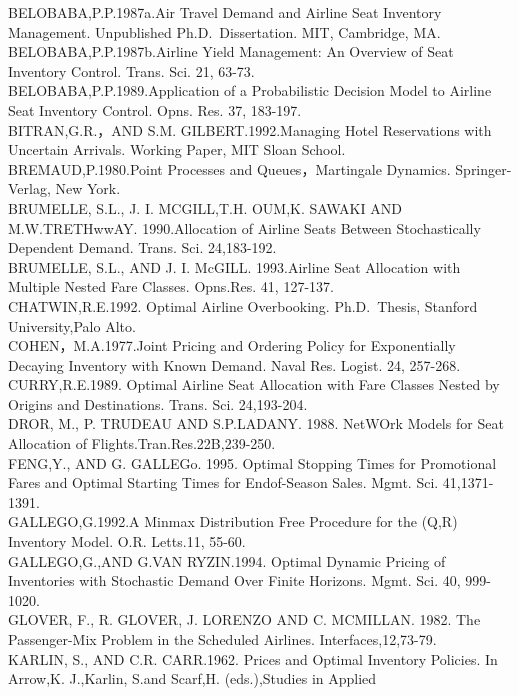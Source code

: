 BELOBABA,P.P.1987a.Air Travel Demand and Airline Seat Inventory
Management. Unpublished Ph.D.~Dissertation. MIT, Cambridge, MA.\\
BELOBABA,P.P.1987b.Airline Yield Management: An Overview of Seat
Inventory Control. Trans. Sci. 21, 63-73.\\
BELOBABA,P.P.1989.Application of a Probabilistic Decision Model to
Airline Seat Inventory Control. Opns. Res. 37, 183-197.\\
BITRAN,G.R.，AND S.M. GILBERT.1992.Managing Hotel Reservations with
Uncertain Arrivals. Working Paper, MIT Sloan School.\\
BREMAUD,P.1980.Point Processes and Queues，Martingale Dynamics.
Springer-Verlag, New York.\\
BRUMELLE, S.L., J. I. MCGILL,T.H. OUM,K. SAWAKI AND M.W.TRETHwwAY.
1990.Allocation of Airline Seats Between Stochastically Dependent
Demand. Trans. Sci. 24,183-192.\\
BRUMELLE, S.L., AND J. I. McGILL. 1993.Airline Seat Allocation with
Multiple Nested Fare Classes. Opns.Res. 41, 127-137.\\
CHATWIN,R.E.1992. Optimal Airline Overbooking. Ph.D.~Thesis, Stanford
University,Palo Alto.\\
COHEN，M.A.1977.Joint Pricing and Ordering Policy for Exponentially
Decaying Inventory with Known Demand. Naval Res. Logist. 24, 257-268.\\
CURRY,R.E.1989. Optimal Airline Seat Allocation with Fare Classes Nested
by Origins and Destinations. Trans. Sci. 24,193-204.\\
DROR, M., P. TRUDEAU AND S.P.LADANY. 1988. NetWOrk Models for Seat
Allocation of Flights.Tran.Res.22B,239-250.\\
FENG,Y., AND G. GALLEGo. 1995. Optimal Stopping Times for Promotional
Fares and Optimal Starting Times for Endof-Season Sales. Mgmt. Sci.
41,1371-1391.\\
GALLEGO,G.1992.A Minmax Distribution Free Procedure for the (Q,R)
Inventory Model. O.R. Letts.11, 55-60.\\
GALLEGO,G.,AND G.VAN RYZIN.1994. Optimal Dynamic Pricing of Inventories
with Stochastic Demand Over Finite Horizons. Mgmt. Sci. 40, 999-1020.\\
GLOVER, F., R. GLOVER, J. LORENZO AND C. MCMILLAN. 1982. The
Passenger-Mix Problem in the Scheduled Airlines. Interfaces,12,73-79.\\
KARLIN, S., AND C.R. CARR.1962. Prices and Optimal Inventory Policies.
In Arrow,K. J.,Karlin, S.and Scarf,H. (eds.),Studies in Applied
